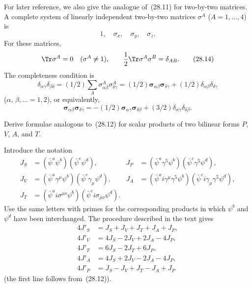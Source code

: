 For later reference, we also give the analogue of~(28.11) for two-by-two matrices. A complete system of linearly independent two-by-two matrices $\sigma^A$ ($A = 1,\ldots,4$) is
\begin{equation}
1,\quad \sigma_x,\quad \sigma_y,\quad \sigma_z.
\tag{28.13}
\end{equation}
For these matrices,
\begin{equation}
\Tr\sigma^A = 0\quad (\sigma^A \neq 1),\qquad \frac{1}{2}\Tr\sigma^A\sigma^B = \delta_{AB}.
\tag{28.14}
\end{equation}
The completeness condition is
\begin{equation}
\delta_{\alpha\gamma}\delta_{\beta\delta} = (1/2)\sum_A\sigma^A_{\alpha\beta}\sigma^A_{\delta\gamma} = (1/2)\boldsymbol\sigma_{\alpha\beta}\boldsymbol\sigma_{\delta\gamma} + (1/2)\delta_{\alpha\beta}\delta_{\delta\gamma}
\tag{28.15}
\end{equation}
($\alpha$, $\beta, \ldots = 1, 2$), or equivalently,
\begin{equation}
\boldsymbol\sigma_{\alpha\beta}\boldsymbol\sigma_{\delta\gamma} = -(1/2)\boldsymbol\sigma_{\alpha\gamma}\boldsymbol\sigma_{\delta\beta} + (3/2)\delta_{\alpha\gamma}\delta_{\delta\beta}.
\tag{28.16}
\end{equation}

\ProblemHeading
Derive formulae analogous to~(28.12) for scalar products of two bilinear forms $P$, $V$, $A$, and $T$.

\SolutionHeading Introduce the notation
\begin{align*}
J_S &= (\bar\psi^a\psi^b)(\bar\psi^c\psi^d), & J_P &= (\bar\psi^a\gamma^5\psi^b)(\bar\psi^c\gamma^5\psi^d),\\
J_V &= (\bar\psi^a\gamma^\mu\psi^b)(\bar\psi^c\gamma_\mu\psi^d), & J_A &= (\bar\psi^a i\gamma^\mu\gamma^5\psi^b)(\bar\psi^c i\gamma_\mu\gamma^5\psi^d),\\
J_T &= (\bar\psi^a i\sigma^{\mu\nu}\psi^b)(\bar\psi^c i\sigma_{\mu\nu}\psi^d).
\end{align*}
Use the same letters with primes for the corresponding products in which $\psi^b$ and $\psi^d$ have been interchanged. The procedure described in the text gives
\begin{align*}
4J'_S &= J_S + J_V + J_T + J_A + J_P,\\
4J'_V &= 4J_S - 2J_V + 2J_A - 4J_P,\\
4J'_T &= 6J_S - 2J_T + 6J_P,\\
4J'_A &= 4J_S + 2J_V - 2J_A - 4J_P,\\
4J'_P &= J_S - J_V + J_T - J_A + J_P
\end{align*}
(the first line follows from~(28.12)).
